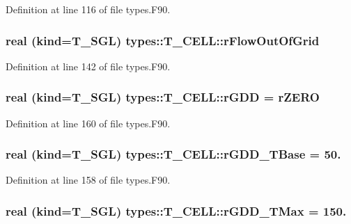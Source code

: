 Definition at line 116 of file types.F90.

\hypertarget{typetypes_1_1_t___c_e_l_l_adcfb3d823e339db1f3cf8521b30ae0a8}{
\subsubsection[{rFlowOutOfGrid}]{\setlength{\rightskip}{0pt plus 5cm}real (kind={\bf T\_\-SGL}) {\bf types::T\_\-CELL::rFlowOutOfGrid}}}
\label{typetypes_1_1_t___c_e_l_l_adcfb3d823e339db1f3cf8521b30ae0a8}


Definition at line 142 of file types.F90.

\hypertarget{typetypes_1_1_t___c_e_l_l_af9d73342889d5c096afc56647d441657}{
\subsubsection[{rGDD}]{\setlength{\rightskip}{0pt plus 5cm}real (kind={\bf T\_\-SGL}) {\bf types::T\_\-CELL::rGDD} = {\bf rZERO}}}
\label{typetypes_1_1_t___c_e_l_l_af9d73342889d5c096afc56647d441657}


Definition at line 160 of file types.F90.

\hypertarget{typetypes_1_1_t___c_e_l_l_aa14e99827ceb68568f6606ee33094335}{
\subsubsection[{rGDD\_\-TBase}]{\setlength{\rightskip}{0pt plus 5cm}real (kind={\bf T\_\-SGL}) {\bf types::T\_\-CELL::rGDD\_\-TBase} = 50.}}
\label{typetypes_1_1_t___c_e_l_l_aa14e99827ceb68568f6606ee33094335}


Definition at line 158 of file types.F90.

\hypertarget{typetypes_1_1_t___c_e_l_l_a810f77f0d2e171c26b1e9f236b30fe29}{
\subsubsection[{rGDD\_\-TMax}]{\setlength{\rightskip}{0pt plus 5cm}real (kind={\bf T\_\-SGL}) {\bf types::T\_\-CELL::rGDD\_\-TMax} = 150.}}
\label{typetypes_1_1_t___c_e_l_l_a810f77f0d2e171c26b1e9f236b30fe29}


